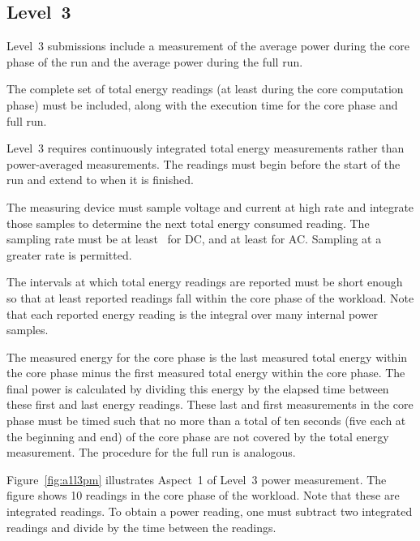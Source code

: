 \subsection{Level~3}
\noindent
Level~3 submissions include a measurement of the average power during the core phase of the run and the average power during the full run.
\wl

\noindent
The complete set of total energy readings (at least \MinMeasurementsCorePhaseLTwoThree{} during the core computation phase) must be included, along with the execution time for the core phase and full run.
\wl

\noindent
Level~3 requires continuously integrated total energy measurements rather than power-averaged measurements.
The readings must begin before the start of the run and extend to when it is finished.
\wl

\noindent
The measuring device must sample voltage and current at high rate and integrate those samples to determine the next total energy consumed reading.
The sampling rate must be at least~\SpecRateLThreeDC{} for DC, and at least \SpecRateLThreeAC{} for AC.
Sampling at a greater rate is permitted.
\wl

\noindent
The intervals at which total energy readings are reported must be short enough so that at least \MinMeasurementsCorePhaseLTwoThree{} reported readings fall within the core phase of the workload.
Note that each reported energy reading is the integral over many internal power samples.
\wl

\noindent
The measured energy for the core phase is the last measured total energy within the core phase minus the first measured total energy within the core phase.
The final power is calculated by dividing this energy by the elapsed time between these first and last energy readings.
These last and first measurements in the core phase must be timed such that no more than a total of ten seconds (five each at the beginning and end) of the core phase are not covered by the total energy measurement.
The procedure for the full run is analogous.
\wl

\noindent
Figure~\ref{fig:a1l3pm} illustrates Aspect~1 of  Level~3 power measurement.
The figure shows 10 readings in the core phase of the workload.
Note that these are integrated readings.
To obtain a power reading, one must subtract two integrated readings and divide by the time between the readings.

